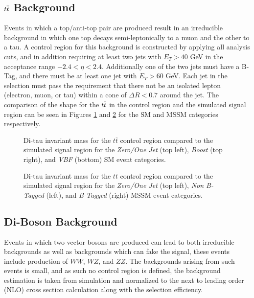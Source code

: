 \subsection{\texorpdfstring{$t\overline{t}$}{TTBar} Background}
Events in which a top/anti-top pair are produced result in an irreducible background in which one top decays semi-leptonically to a muon and the other to a tau.
A control region for this background is constructed by applying all analysis cuts, and in addition requiring at least two jets  with $E_{T} > 40$ GeV in the acceptance range $-2.4 < \eta < 2.4$.
Additionally one of the two jets must have a B-Tag, and there must be at least one jet with $E_{T} > 60$ GeV.
Each jet in the selection must pass the requirement that there not be an isolated lepton (electron, muon, or tau) within a cone of $\Delta R < 0.7$  around the jet.
The comparison of the shape for the $t\overline{t}$ in the control region and the simulated signal region can be seen in Figures \ref{fig:smttbar} and \ref{fig:mssmttbar} for the SM and MSSM categories respectively.

\begin{figure}[ht]
\centering
{}

\caption{Di-tau invariant mass for the $t\overline{t}$ control region compared to the simulated signal region for the \emph{Zero/One Jet} (top left), \emph{Boost} (top right), and \emph{VBF} (bottom) SM event categories.}
\label{fig:smttbar}
\end{figure}

\begin{figure}[tpb]
\centering
{}
\caption{Di-tau invariant mass for the $t\overline{t}$ control region compared to the simulated signal region for the \emph{Zero/One Jet} (top left), \emph{Non B-Tagged} (left), and \emph{B-Tagged} (right) MSSM event categories.}
\label{fig:mssmttbar}
\end{figure}

\subsection{Di-Boson Background}
Events in which two vector bosons are produced can lead to both irreducible backgrounds as well as backgrounds which can fake the signal, these events include production of $WW$, $WZ$, and $ZZ$.
The backgrounds arising from such events is small, and as such no control region is defined, the background estimation is taken from simulation and normalized to the next to leading order (NLO) cross section calculation\cite{VVCROSSSECTION} along with the selection efficiency.
